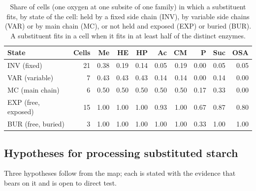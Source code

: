 \documentclass[preprint,12pt]{elsarticle}
\begin{document}
\begin{table}[htbp]
\centering\renewcommand{\baselinestretch}{1}\footnotesize\setlength{\tabcolsep}{4pt}
\caption{Share of cells (one oxygen at one subsite of one family) in which a substituent fits, by state of the cell: held by a fixed side chain (INV), by variable side chains (VAR) or by main chain (MC), or not held and exposed (EXP) or buried (BUR). A substituent fits in a cell when it fits in at least half of the distinct enzymes.}
\label{tab:fit}
\begin{tabular}{lrrrrrrrrr}
\toprule
State & Cells & Me & HE & HP & Ac & CM & P & Suc & OSA\\
\midrule
INV (fixed) & 21 & 0.38 & 0.19 & 0.14 & 0.05 & 0.19 & 0.00 & 0.05 & 0.05\\
VAR (variable) & 7 & 0.43 & 0.43 & 0.43 & 0.14 & 0.14 & 0.00 & 0.14 & 0.00\\
MC (main chain) & 6 & 0.50 & 0.50 & 0.50 & 0.50 & 0.50 & 0.17 & 0.33 & 0.00\\
EXP (free, exposed) & 15 & 1.00 & 1.00 & 1.00 & 0.93 & 1.00 & 0.67 & 0.87 & 0.80\\
BUR (free, buried) & 3 & 1.00 & 1.00 & 1.00 & 1.00 & 1.00 & 0.33 & 1.00 & 1.00\\
\bottomrule
\end{tabular}

\par\smallskip{}
\end{table}

\subsection{Hypotheses for processing substituted starch}\label{sec:design}
Three hypotheses follow from the map; each is stated with the evidence that bears on it and is open to direct test.
\end{document}
